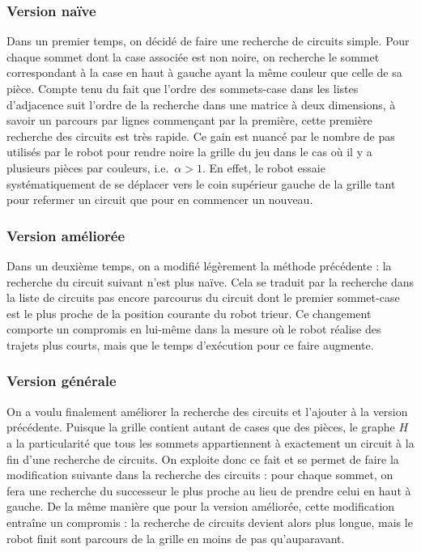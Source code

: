 \documentclass[12pt,a4paper]{article}
\begin{document}
\subsubsection*{Version na\"ive}
Dans un premier temps, on d\'ecid\'e de faire une recherche de circuits simple. 
Pour chaque sommet dont la case associ\'ee est non noire, on recherche le sommet 
correspondant \`a la case en haut \`a gauche ayant la m\^eme couleur que celle 
de sa pi\`ece. Compte tenu du fait que l'ordre des sommets-case dans les listes 
d'adjacence suit l'ordre de la recherche dans une matrice \`a deux dimensions, 
\`a savoir un parcours par lignes commen\c{c}ant par la premi\`ere, cette 
premi\`ere recherche des circuits est tr\`es rapide. Ce gain est nuanc\'e par le 
nombre de pas utilis\'es par le robot pour rendre noire la grille du jeu dans le 
cas o\`u il y a plusieurs pi\`eces par couleurs, i.e.\ $\alpha > 1$. En effet, 
le robot essaie syst\'ematiquement de se d\'eplacer vers le coin sup\'erieur 
gauche de la grille tant pour refermer un circuit que pour en commencer un 
nouveau.

\subsubsection*{Version am\'elior\'ee}
Dans un deuxi\`eme temps, on a modifi\'e l\'eg\`erement la m\'ethode 
pr\'ec\'edente : la recherche du circuit suivant n'est plus na\"ive. Cela se 
traduit par la recherche dans la liste de circuits pas encore parcourus du 
circuit dont le premier sommet-case est le plus proche de la position courante 
du robot trieur. Ce changement comporte un compromis en lui-m\^eme dans la 
mesure o\`u le robot r\'ealise des trajets plus courts, mais que le temps 
d'ex\'ecution pour ce faire augmente.

\subsubsection*{Version g\'en\'erale}
On a voulu finalement am\'eliorer la recherche des circuits et l'ajouter \`a la 
version pr\'ec\'edente. Puisque la grille contient autant de cases que des 
pi\`eces, le graphe $H$ a la particularit\'e que tous les sommets appartiennent 
\`a exactement un circuit \`a la fin d'une recherche de circuits. On exploite 
donc ce fait et se permet de faire la modification suivante dans la recherche 
des circuits : pour chaque sommet, on fera une recherche du successeur le plus 
proche au lieu de prendre celui en haut \`a gauche. De la m\^eme mani\`ere que 
pour la version am\'elior\'ee, cette modification entra\^ine un compromis : la 
recherche de circuits devient alors plus longue, mais le robot finit sont 
parcours de la grille en moins de pas qu'auparavant.
\end{document}
